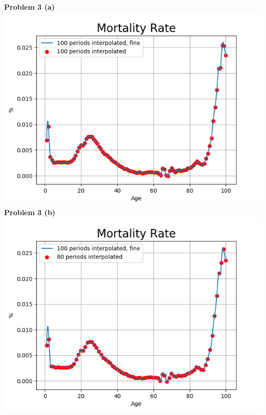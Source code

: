 \documentclass[letterpaper,12pt]{article}
\theoremstyle{definition}
\begin{document}
\noindent\textbf{Problem 3 (a)}\\
\includegraphics[scale=0.5]{images_dem/imm_rate_100.png}
\\

\noindent\textbf{Problem 3 (b)}\\
\includegraphics[scale=0.5]{images_dem/imm_rate_80.png}
\\
\end{document}
